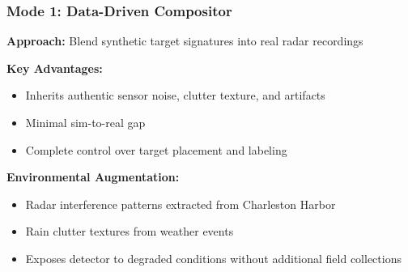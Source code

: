 \documentclass[aspectratio=169, 10pt]{beamer}
\begin{document}
\begin{frame}
  \frametitle{Mode 1: Data-Driven Compositor}

  \textbf{Approach:} Blend synthetic target signatures into real radar recordings

  \vspace{0.3cm}
  \begin{center}
  \end{center}

  \vspace{0.5cm}
  \textbf{Key Advantages:}
  \begin{itemize}
    \item Inherits authentic sensor noise, clutter texture, and artifacts
    \item Minimal sim-to-real gap
    \item Complete control over target placement and labeling
  \end{itemize}

  \vspace{0.3cm}
  \textbf{Environmental Augmentation:}
  \begin{itemize}
    \item Radar interference patterns extracted from Charleston Harbor
    \item Rain clutter textures from weather events
    \item Exposes detector to degraded conditions without additional field collections
  \end{itemize}
\end{frame}
\end{document}

